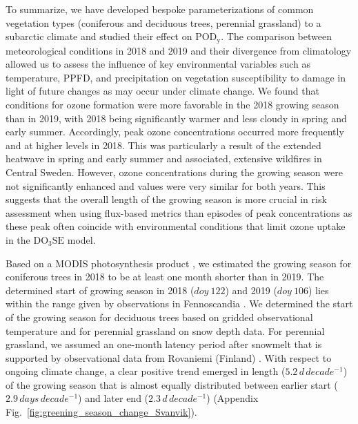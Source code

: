 \documentclass[bg, manuscript]{copernicus}
\begin{document}
To summarize, we have developed bespoke parameterizations of common vegetation types (coniferous and deciduous trees, perennial grassland) to a subarctic climate and studied their effect on $\mathrm{POD_y}$. The comparison between meteorological conditions in 2018 and 2019 and their divergence from climatology allowed us to assess the influence of key environmental variables such as temperature, PPFD, and precipitation on vegetation susceptibility to  damage in light of future changes as may occur under climate change. We found that conditions for ozone formation were more favorable in the 2018 growing season than in 2019, with 2018 being significantly warmer and less cloudy in spring and early summer. Accordingly, peak ozone concentrations occurred more frequently and at higher levels in 2018. This was particularly a result of the extended heatwave in spring and early summer and associated, extensive wildfires in Central Sweden. However, ozone concentrations during the growing season were not significantly enhanced and  values were very similar for both years.
This suggests that the overall length of the growing season is more crucial in risk assessment when using flux-based metrics than episodes of peak concentrations as these peak \chem{[O_3]} often coincide with environmental conditions that limit ozone uptake in the $\mathrm{DO_3SE}$ model.

Based on a MODIS photosynthesis product \citep{MODIS_PSN}, we estimated the growing season for coniferous trees in 2018 to be at least one month shorter than in 2019. The determined start of growing season in 2018 ($\unit{doy}~122$) and 2019 ($\unit{doy}~106$) lies within the range given by observations in Fennoscandia \citep{TB:Kolari2007,IVL:Karlsson2018}. We determined the start of the growing season for deciduous trees based on gridded observational temperature and for perennial grassland on snow depth data. For perennial grassland, we assumed an one-month latency period after snowmelt that is supported by observational data from Rovaniemi (Finland) \citep{FCR:Korhonen2018}. With respect to ongoing climate change, a clear positive trend emerged in length ($5.2\,\unit{d\,decade^{-1}}$) of the growing season that is almost equally distributed between earlier start ($2.9\,\unit{days\,decade^{-1}}$) and later end ($2.3\,\unit{d\,decade^{-1}}$) (Appendix Fig.~\ref{fig:greening_season_change_Svanvik}).
\end{document}
